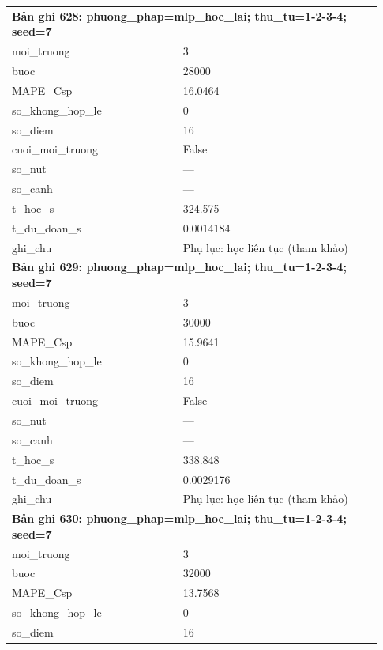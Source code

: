 \begin{longtable}{p{0.43\linewidth}p{0.50\linewidth}}
\midrule
\multicolumn{2}{p{0.95\linewidth}}{\textbf{Bản ghi 628: phuong\_phap=mlp\_hoc\_lai; thu\_tu=1-2-3-4; seed=7}} \\
moi\_\allowbreak truong & 3 \\
buoc & 28000 \\
MAPE\_\allowbreak Csp & 16.0464 \\
so\_\allowbreak khong\_\allowbreak hop\_\allowbreak le & 0 \\
so\_\allowbreak diem & 16 \\
cuoi\_\allowbreak moi\_\allowbreak truong & False \\
so\_\allowbreak nut & — \\
so\_\allowbreak canh & — \\
t\_\allowbreak hoc\_\allowbreak s & 324.575 \\
t\_\allowbreak du\_\allowbreak doan\_\allowbreak s & 0.0014184 \\
ghi\_\allowbreak chu & Phụ lục: học liên tục (tham khảo) \\
\midrule
\multicolumn{2}{p{0.95\linewidth}}{\textbf{Bản ghi 629: phuong\_phap=mlp\_hoc\_lai; thu\_tu=1-2-3-4; seed=7}} \\
moi\_\allowbreak truong & 3 \\
buoc & 30000 \\
MAPE\_\allowbreak Csp & 15.9641 \\
so\_\allowbreak khong\_\allowbreak hop\_\allowbreak le & 0 \\
so\_\allowbreak diem & 16 \\
cuoi\_\allowbreak moi\_\allowbreak truong & False \\
so\_\allowbreak nut & — \\
so\_\allowbreak canh & — \\
t\_\allowbreak hoc\_\allowbreak s & 338.848 \\
t\_\allowbreak du\_\allowbreak doan\_\allowbreak s & 0.0029176 \\
ghi\_\allowbreak chu & Phụ lục: học liên tục (tham khảo) \\
\midrule
\multicolumn{2}{p{0.95\linewidth}}{\textbf{Bản ghi 630: phuong\_phap=mlp\_hoc\_lai; thu\_tu=1-2-3-4; seed=7}} \\
moi\_\allowbreak truong & 3 \\
buoc & 32000 \\
MAPE\_\allowbreak Csp & 13.7568 \\
so\_\allowbreak khong\_\allowbreak hop\_\allowbreak le & 0 \\
so\_\allowbreak diem & 16 \\

\end{longtable}
